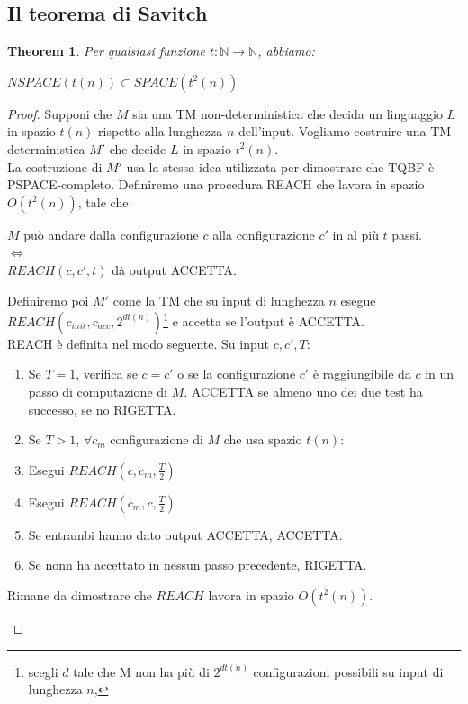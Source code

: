 \documentclass[a4paper, 12pt]{article}
\newtheorem{theorem}{Theorem}[section]
\begin{document}
\subsection{Il teorema di Savitch}
\begin{theorem}
Per qualsiasi funzione $t: \mathbb{N} \rightarrow \mathbb{N}$, abbiamo:
\begin{center}
$NSPACE(t(n)) \subset SPACE(t^{2}(n))$
\end{center}
\end{theorem}
\begin{proof}
Supponi che $M$ sia una TM non-deterministica che decida un linguaggio $L$ in spazio $t(n)$ rispetto alla lunghezza $n$ dell'input. Vogliamo costruire una TM deterministica $M'$ che decide $L$ in spazio $t^{2}(n)$.\\
La costruzione di $M'$ usa la stessa idea utilizzata per dimostrare che TQBF \`e PSPACE-completo. Definiremo una procedura REACH che lavora in spazio $O(t^{2}(n))$, tale che:
\begin{center}
$M$ pu\`o andare dalla configurazione $c$ alla configurazione $c'$ in al pi\`u $t$ passi. \\ $\iff$ \\ $REACH(c,c',t)$ d\`a output ACCETTA.
\end{center}
Definiremo poi $M'$ come la TM che su input di lunghezza $n$ esegue $REACH(c_{init}, c_{acc}, 2^{dt(n)})$\footnote{scegli $d$ tale che M non ha pi\`u di $2^{dt(n)}$ configurazioni possibili su input di lunghezza $n$,} e accetta se l'output \`e ACCETTA.\\
REACH \`e definita nel modo seguente. Su input $c,c',T$:
\begin{enumerate}
\item Se $T=1$, verifica se $c=c'$ o se la configurazione $c'$ \`e raggiungibile da $c$ in un passo di computazione di $M$. ACCETTA se almeno uno dei due test ha successo, se no RIGETTA.
\item Se $T>1$, $\forall c_m$ configurazione di $M$ che usa spazio $t(n)$:
\item Esegui $REACH(c,c_m,\frac{T}{2})$
\item Esegui $REACH(c_m,c,\frac{T}{2})$
\item Se entrambi hanno dato output ACCETTA, ACCETTA.
\item Se nonn ha accettato in nessun passo precedente, RIGETTA.
\end{enumerate}
Rimane da dimostrare che $REACH$ lavora in spazio $O(t^{2}(n))$.\begin{itemize}

\end{itemize}
\end{proof}
\end{document}
